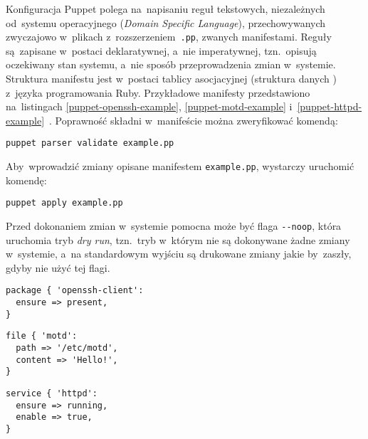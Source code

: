 \documentclass[thesis]{subfiles}
\begin{document}
Konfiguracja Puppet polega na~napisaniu reguł tekstowych, niezależnych od~systemu operacyjnego (\emph{Domain Specific Language}), przechowywanych zwyczajowo w~plikach z~rozszerzeniem~\texttt{.pp}, zwanych manifestami. Reguły są~zapisane w~postaci deklaratywnej, a~nie imperatywnej, tzn.~opisują oczekiwany stan systemu, a~nie sposób przeprowadzenia zmian w~systemie. Struktura manifestu jest w~postaci tablicy asocjacyjnej (struktura danych ) z~języka programowania Ruby. Przykładowe manifesty przedstawiono na~listingach \ref{puppet-openssh-example}, \ref{puppet-motd-example} i~\ref{puppet-httpd-example}~\cite{puppet-examples}. Poprawność składni w~manifeście  można zweryfikować komendą:
\begin{center}
	\texttt{puppet parser validate example.pp}
\end{center}

Aby~wprowadzić zmiany opisane manifestem \texttt{example.pp}, wystarczy uruchomić komendę:
\begin{center}
	\texttt{puppet apply example.pp}
\end{center}

Przed dokonaniem zmian w~systemie pomocna może być flaga \texttt{-{}-noop}, która uruchomia tryb \emph{dry run}, tzn.~tryb w~którym nie są dokonywane żadne zmiany w~systemie, a~na standardowym wyjściu są drukowane zmiany jakie by~zaszły, gdyby nie użyć tej flagi.

\begin{minipage}{\linewidth} %
\begin{lstlisting}[numbers=none,caption={Manifest Puppet gwarantujący, że~pakiet \texttt{openssh-client}, dostarczający klienta SSH, jest zainstalowany},label=puppet-openssh-example]
package { 'openssh-client':
  ensure => present,
}
\end{lstlisting}
\end{minipage}

\begin{lstlisting}[numbers=none,caption={Manifest Puppet gwarantujący istnienie pliku \hreftt{https://en.wikipedia.org/wiki/Motd_(Unix)}{/etc/motd} z~komunikatem \texttt{Hello!}, który wyświetla się~użytkownikom systemu po~zalogowaniu},label=puppet-motd-example]
file { 'motd':
  path => '/etc/motd',
  content => 'Hello!',
}
\end{lstlisting}

\begin{lstlisting}[numbers=none,caption={Manifest Puppet gwarantujący, że~\gls{demon} \hreftt{https://httpd.apache.org/}{httpd} jest włączony i~działa},label=puppet-httpd-example]
service { 'httpd':
  ensure => running,
  enable => true,
}
\end{lstlisting}
\end{document}
